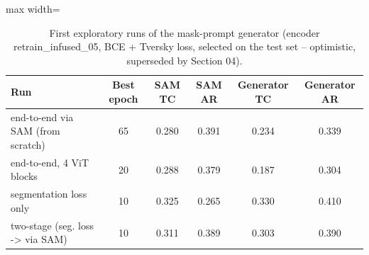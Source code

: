 \begin{table}[htbp]
\centering
\small
\begin{adjustbox}{max width=\linewidth}
\begin{tabular}{lccccc}
\toprule
Run & Best epoch & SAM TC & SAM AR & Generator TC & Generator AR \\
\midrule
end-to-end via SAM (from scratch) & 65 & 0.280 & 0.391 & 0.234 & 0.339 \\
end-to-end, 4 ViT blocks & 20 & 0.288 & 0.379 & 0.187 & 0.304 \\
segmentation loss only & 10 & 0.325 & 0.265 & 0.330 & 0.410 \\
two-stage (seg. loss -> via SAM) & 10 & 0.311 & 0.389 & 0.303 & 0.390 \\
\bottomrule
\end{tabular}
\end{adjustbox}
\caption{First exploratory runs of the mask-prompt generator (encoder retrain\_infused\_05, BCE + Tversky loss, selected on the test set -- optimistic, superseded by Section 04).}
\label{tab:exploratory}
\end{table}
